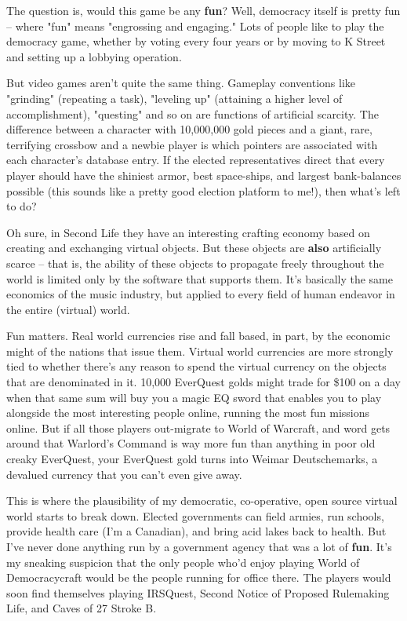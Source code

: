 The question is, would this game be any \textbf{fun}? Well,
democracy itself is pretty fun -- where "fun" means "engrossing and
engaging." Lots of people like to play the democracy game, whether
by voting every four years or by moving to K Street and setting up
a lobbying operation.

But video games aren't quite the same thing. Gameplay conventions
like "grinding" (repeating a task), "leveling up" (attaining a
higher level of accomplishment), "questing" and so on are functions
of artificial scarcity. The difference between a character with
10,000,000 gold pieces and a giant, rare, terrifying crossbow and a
newbie player is which pointers are associated with each
character's database entry. If the elected representatives direct
that every player should have the shiniest armor, best space-ships,
and largest bank-balances possible (this sounds like a pretty good
election platform to me!), then what's left to do?

Oh sure, in Second Life they have an interesting crafting economy
based on creating and exchanging virtual objects. But these objects
are \textbf{also} artificially scarce -- that is, the ability of
these objects to propagate freely throughout the world is limited
only by the software that supports them. It's basically the same
economics of the music industry, but applied to every field of
human endeavor in the entire (virtual) world.

Fun matters. Real world currencies rise and fall based, in part, by
the economic might of the nations that issue them. Virtual world
currencies are more strongly tied to whether there's any reason to
spend the virtual currency on the objects that are denominated in
it. 10,000 EverQuest golds might trade for \$100 on a day when that
same sum will buy you a magic EQ sword that enables you to play
alongside the most interesting people online, running the most fun
missions online. But if all those players out-migrate to World of
Warcraft, and word gets around that Warlord's Command is way more
fun than anything in poor old creaky EverQuest, your EverQuest gold
turns into Weimar Deutschemarks, a devalued currency that you can't
even give away.

This is where the plausibility of my democratic, co-operative, open
source virtual world starts to break down. Elected governments can
field armies, run schools, provide health care (I'm a Canadian),
and bring acid lakes back to health. But I've never done anything
run by a government agency that was a lot of \textbf{fun}. It's my
sneaking suspicion that the only people who'd enjoy playing World
of Democracycraft would be the people running for office there. The
players would soon find themselves playing IRSQuest, Second Notice
of Proposed Rulemaking Life, and Caves of 27 Stroke B.

